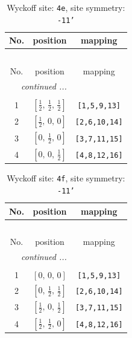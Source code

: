 \documentclass[fleqn,8pt]{jsarticle}
\begin{document}
\begin{longtable}{ccc}
\caption{Wyckoff site: {\tt 4e}, site symmetry: {\tt -11'}}
 \\
 \hline \hline
No. & position & mapping \\ \hline \endfirsthead

\multicolumn{2}{l}{\tablename\ \thetable{}} \\
 \hline \hline
No. & position & mapping \\ \hline \endhead

 \hline \hline
\multicolumn{2}{r}{\footnotesize\it continued ...} \\ \endfoot

 \hline \hline
\multicolumn{2}{r}{} \\ \endlastfoot

1 & $\left[ \frac{1}{2},\, \frac{1}{2},\, \frac{1}{2} \right]$ & {\tt [1,5,9,13]} \\ \hline
2 & $\left[ \frac{1}{2},\, 0,\, 0 \right]$ & {\tt [2,6,10,14]} \\ \hline
3 & $\left[ 0,\, \frac{1}{2},\, 0 \right]$ & {\tt [3,7,11,15]} \\ \hline
4 & $\left[ 0,\, 0,\, \frac{1}{2} \right]$ & {\tt [4,8,12,16]} \\
\end{longtable}
\renewcommand{\arraystretch}{1.2}
\begin{longtable}{ccc}
\caption{Wyckoff site: {\tt 4f}, site symmetry: {\tt -11'}}
 \\
 \hline \hline
No. & position & mapping \\ \hline \endfirsthead

\multicolumn{2}{l}{\tablename\ \thetable{}} \\
 \hline \hline
No. & position & mapping \\ \hline \endhead

 \hline \hline
\multicolumn{2}{r}{\footnotesize\it continued ...} \\ \endfoot

 \hline \hline
\multicolumn{2}{r}{} \\ \endlastfoot

1 & $\left[ 0,\, 0,\, 0 \right]$ & {\tt [1,5,9,13]} \\ \hline
2 & $\left[ 0,\, \frac{1}{2},\, \frac{1}{2} \right]$ & {\tt [2,6,10,14]} \\ \hline
3 & $\left[ \frac{1}{2},\, 0,\, \frac{1}{2} \right]$ & {\tt [3,7,11,15]} \\ \hline
4 & $\left[ \frac{1}{2},\, \frac{1}{2},\, 0 \right]$ & {\tt [4,8,12,16]} \\
\end{longtable}
\end{document}
